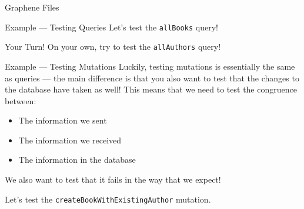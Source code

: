 \documentclass[t]{beamer}
\newcommand{\code}[1]{\texttt{#1}}
\begin{document}
	\begin{frame}{Graphene Files}
		
		
	\end{frame}

	\begin{frame}{Example --- Testing Queries}
		Let's test the \code{allBooks} query!	

		\framebreak

		
	\end{frame}

	\begin{frame}{Your Turn!}
		On your own, try to test the \code{allAuthors} query!
	\end{frame}

	\begin{frame}{Example --- Testing Mutations}
		Luckily, testing mutations is essentially the same as queries --- the main difference is that you also want to test that the changes to the database have taken as well! This means that we need to test the congruence between:
		\begin{itemize}
			\item The information we sent
			\item The information we received
			\item The information in the database
		\end{itemize}

		We also want to test that it fails in the way that we expect!

		Let's test the \code{createBookWithExistingAuthor} mutation.

		\framebreak

	
	\end{frame}
\end{document}
